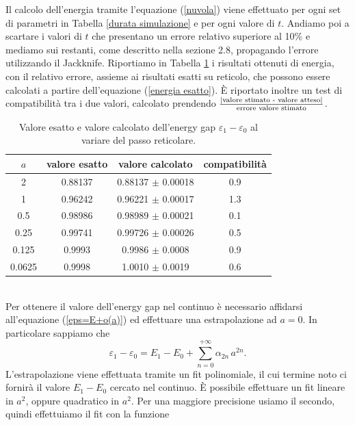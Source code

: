 \documentclass{article}
\begin{document}
Il calcolo dell'energia tramite l'equazione (\ref{nuvola}) viene effettuato per ogni set di parametri in Tabella \ref{durata simulazione} e per ogni valore di $t$. Andiamo poi a scartare i valori di $t$ che presentano un errore relativo superiore al 10\% e mediamo sui restanti, come descritto nella sezione 2.8, propagando l'errore utilizzando il Jackknife. Riportiamo in Tabella \ref{tabella energie simulate} i risultati ottenuti di energia, con il relativo errore, assieme ai risultati esatti su reticolo, che possono essere calcolati a partire dell'equazione (\ref{energia esatto}). È riportato inoltre un test di compatibilità tra i due valori, calcolato prendendo $\frac{|\textup{valore stimato - valore atteso}|}{\textup{errore valore stimato}}$.
\begin{table}[h]
    \centering
    \begin{tabular}{||c c c c||} 
     \hline
     $a$ & valore esatto & valore calcolato & compatibilità\\[0.5ex] 
     \hline\hline
     2      & 0.88137  & 0.88137  $\pm$ 0.00018 & 0.9 \\
     1      & 0.96242  & 0.96221 $\pm$ 0.00017 & 1.3 \\
     0.5    & 0.98986  & 0.98989 $\pm$ 0.00021 & 0.1 \\
     0.25   & 0.99741  & 0.99726  $\pm$ 0.00026 & 0.5 \\
     0.125  & 0.9993  & 0.9986 $\pm$ 0.0008 & 0.9 \\
     0.0625 & 0.9998  & 1.0010 $\pm$ 0.0019 & 0.6 \\[1ex] 
     \hline
    \end{tabular}
    \caption{Valore esatto e valore calcolato dell'energy gap $\varepsilon_1-\varepsilon_0$ al variare del passo reticolare.}
    \label{tabella energie simulate}
\end{table}\\
Per ottenere il valore dell'energy gap nel continuo è necessario affidarsi all'equazione (\ref{eps=E+o(a)}) ed effettuare una estrapolazione ad $a=0$. In particolare sappiamo che 
\begin{equation}
    \varepsilon_1-\varepsilon_0=E_1-E_0+\sum_{n=0}^{+\infty}\alpha_{2n}\,a^{2n}.
\end{equation}
L'estrapolazione viene effettuata tramite un fit polinomiale, il cui termine noto ci fornirà il valore $E_1-E_0$ cercato nel continuo. È possibile effettuare un fit lineare in $a^2$, oppure quadratico in $a^2$. Per una maggiore precisione usiamo il secondo, quindi effettuiamo il fit con la funzione 
\end{document}
